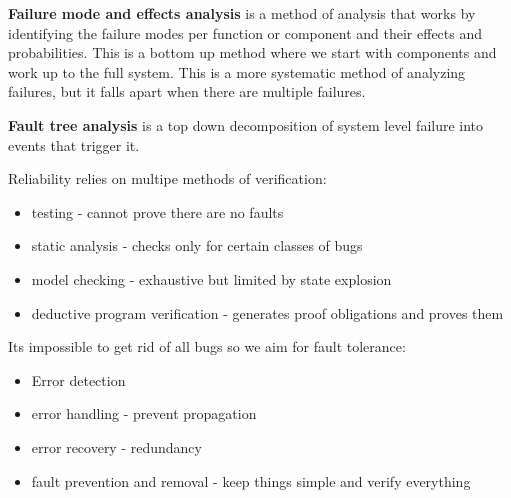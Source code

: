 \documentclass{article}
\begin{document}
\textbf{Failure mode and effects analysis} is a method of analysis that works by identifying the failure modes per function or component and their effects and probabilities. This is a bottom up method where we start with components and work up to the full system. This is a more systematic method of analyzing failures, but it falls apart when there are multiple failures.

\textbf{Fault tree analysis} is a top down decomposition of system level failure into events that trigger it.

Reliability relies on multipe methods of verification:
\begin{itemize}
    \item testing - cannot prove there are no faults
    \item static analysis - checks only for certain classes of bugs
    \item model checking - exhaustive but limited by state explosion
    \item deductive program verification - generates proof obligations and proves them
\end{itemize}

Its impossible to get rid of all bugs so we aim for fault tolerance:
\begin{itemize}
    \item Error detection
    \item error handling - prevent propagation
    \item error recovery - redundancy
    \item fault prevention and removal - keep things simple and verify everything
\end{itemize}




\end{document}
